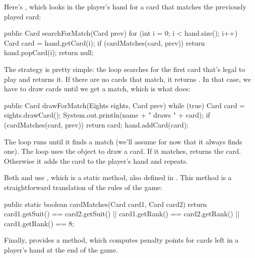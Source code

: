 Here's , which looks in the player's hand for a card that matches the previously played card:

\begin{code}
public Card searchForMatch(Card prev) {
    for (int i = 0; i < hand.size(); i++) {
        Card card = hand.getCard(i);
        if (cardMatches(card, prev)) {
            return hand.popCard(i);
        }
    }
    return null;
}
\end{code}

The strategy is pretty simple: the  loop searches for the first card that's legal to play and returns it.
If there are no cards that match, it returns .
In that case, we have to draw cards until we get a match, which is what  does:

\begin{code}
public Card drawForMatch(Eights eights, Card prev) {
    while (true) {
        Card card = eights.drawCard();
        System.out.println(name + " draws " + card);
        if (cardMatches(card, prev)) {
            return card;
        }
        hand.addCard(card);
    }
}
\end{code}

The  loop runs until it finds a match (we'll assume for now that it always finds one).
The loop uses the  object to draw a card.
If it matches,  returns the card.
Otherwise it adds the card to the player's hand and repeats.

Both  and  use , which is a static method, also defined in .
This method is a straightforward translation of the rules of the game:

\begin{code}
public static boolean cardMatches(Card card1, Card card2) {
    return card1.getSuit() == card2.getSuit()
        || card1.getRank() == card2.getRank()
        || card1.getRank() == 8;
}
\end{code}

Finally,  provides a  method, which computes penalty points for cards left in a player's hand at the end of the game.



